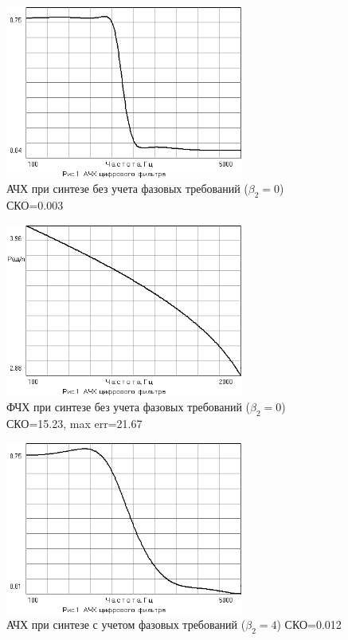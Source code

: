 \begin{figure}[H]
  \centering
  \includegraphics[width=0.7\textwidth]{data/Z4_FN4/Gain(0).png}
  \caption{АЧХ при синтезе без учета фазовых требований ($\beta_2=0$) СКО=0.003}
  \label{fig:}
\end{figure}
\begin{figure}[H]
  \centering
  \includegraphics[width=0.7\textwidth]{data/Z4_FN4/Faza(0).png}
  \caption{ФЧХ при синтезе без учета фазовых требований ($\beta_2=0$) СКО=15.23, max err=21.67}
  \label{fig:}
\end{figure}
\begin{figure}[H]
  \centering
  \includegraphics[width=0.7\textwidth]{data/Z4_FN4/Gain(4).png}
  \caption{АЧХ при синтезе с учетом фазовых требований ($\beta_2=4$) СКО=0.012}
  \label{fig:}
\end{figure}
